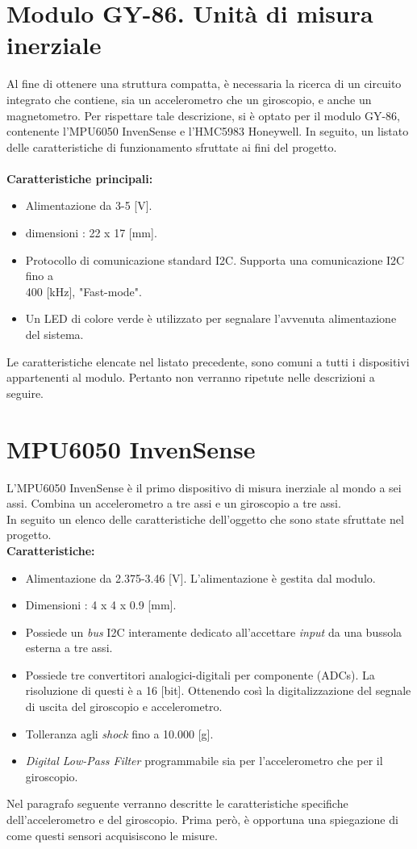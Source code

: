 \section{Modulo GY-86. Unità di misura inerziale}
Al fine di ottenere una struttura compatta, è necessaria la ricerca di un circuito integrato che contiene, sia un accelerometro che un giroscopio, e anche un magnetometro. Per rispettare tale descrizione, si è optato per il modulo GY-86, contenente l'MPU6050 InvenSense e l'HMC5983 Honeywell.
In seguito, un listato delle caratteristiche di funzionamento sfruttate ai fini del progetto.\\\\
\textbf{Caratteristiche principali:}
\begin{itemize}
\item Alimentazione da 3-5 [V].
\item dimensioni : 22 x 17 [mm].
\item Protocollo di comunicazione standard I2C. Supporta una comunicazione I2C fino a\\400 [kHz], "Fast-mode".
\item Un LED di colore verde è utilizzato per segnalare l'avvenuta alimentazione del sistema.
\end{itemize}
Le caratteristiche elencate nel listato precedente, sono comuni a tutti i dispositivi appartenenti al modulo. Pertanto non verranno ripetute nelle descrizioni a seguire. 
    \section{MPU6050 InvenSense}
    L'MPU6050 InvenSense è il primo dispositivo di misura inerziale al mondo a sei assi. Combina un accelerometro a tre assi e un giroscopio a tre assi.\\
    In seguito un elenco delle caratteristiche dell'oggetto che sono state sfruttate nel progetto.\\
    \textbf{Caratteristiche:}
    \begin{itemize}
    \item Alimentazione da 2.375-3.46 [V]. L'alimentazione è gestita dal modulo.
    \item Dimensioni : 4 x 4 x 0.9 [mm].
    \item Possiede un \textit{bus} I2C interamente dedicato all'accettare \textit{input} da una bussola esterna a  tre assi.  
    \item Possiede tre convertitori analogici-digitali per componente (ADCs). La risoluzione di questi è a 16 [bit]. Ottenendo così la digitalizzazione del segnale di uscita del giroscopio e accelerometro.
    \item Tolleranza agli \textit{shock} fino a 10.000 [g]. %
    \item \textit{Digital Low-Pass Filter} programmabile sia per l'accelerometro che per il giroscopio.
    \end{itemize}
Nel paragrafo seguente verranno descritte le caratteristiche specifiche dell'accelerometro e del giroscopio. Prima però, è opportuna una spiegazione di come questi sensori acquisiscono le misure.
